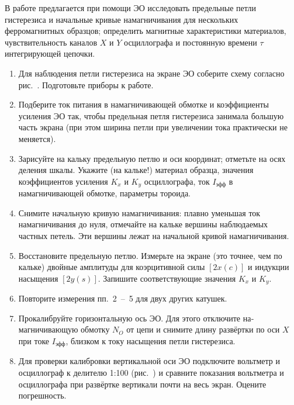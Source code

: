 \begin{lab:task}

В работе предлагается при помощи ЭО исследовать предельные петли гистерезиса и начальные кривые намагничивания для нескольких ферромагнитных образцов; определить магнитные характеристики материалов, чувствительность каналов $X$ и $Y$ осциллографа и постоянную времени $\tau$ интегрирующей цепочки.
\begin{enumerate}
\item
Для наблюдения петли гистерезиса на экране ЭО соберите схему согласно рис.~. Подготовьте приборы к работе.

\item
Подберите ток питания в намагничивающей обмотке и коэффициен­ты усиления ЭО так, чтобы предельная петля гистерезиса занимала большую часть экрана (при этом ширина петли при увеличении тока практически не меняется).

\item
Зарисуйте на кальку предельную петлю и оси координат; отметьте на осях деления шкалы. Укажите (на кальке!) материал образца, значения коэффициентов усиления $K_x$ и $K_y$ осциллографа, ток $I_\text{эфф}$ в намагничивающей обмотке, параметры тороида.

\item
Снимите начальную кривую намагничивания: плавно уменьшая ток намагничивания до нуля, отмечайте на кальке вершины наблюдаемых частных петель. Эти вершины лежат на начальной кривой намагничи­вания.

\item
Восстановите предельную петлю. Измерьте на экране (это точнее, чем по кальке) двойные амплитуды для коэрцитивной силы $[2x(c)]$ и индукции насыщения $[2y(s)]$. Запишите соответствующие значения $K_x$ и $K_y$.

\item
Повторите измерения пп.~2~--~5 для двух других катушек.

\item
Прокалибруйте горизонтальную ось ЭО. Для этого отключите на­магничивающую обмотку $N_O$ от цепи и снимите длину развёртки по оси $X$ при токе $I_\text{эфф}$, близком к току насыщения петли гистерезиса.

\item
Для проверки калибровки вертикальной оси ЭО подключите вольтметр и осциллограф к делителю 1:100 (рис.~) и сравните показания вольтметра и осциллографа при развёртке вертикали почти на весь экран. Оцените погрешность.


\end{enumerate}
\end{lab:task}
